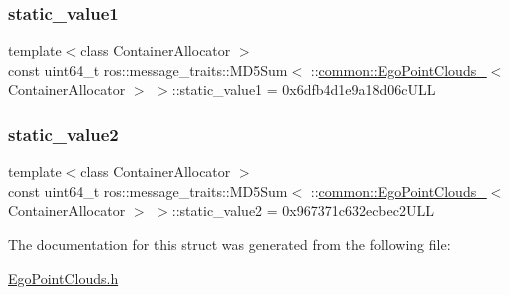 \subsubsection{\texorpdfstring{static\+\_\+value1}{static\_value1}}
{\footnotesize\ttfamily template$<$class Container\+Allocator $>$ \\
const uint64\+\_\+t ros\+::message\+\_\+traits\+::\+M\+D5\+Sum$<$ \+::\hyperlink{structcommon_1_1EgoPointClouds__}{common\+::\+Ego\+Point\+Clouds\+\_\+}$<$ Container\+Allocator $>$ $>$\+::static\+\_\+value1 = 0x6dfb4d1e9a18d06c\+U\+LL\hspace{0.3cm}{\ttfamily [static]}}

\mbox{\label{structros_1_1message__traits_1_1MD5Sum_3_01_1_1common_1_1EgoPointClouds___3_01ContainerAllocator_01_4_01_4_a9f0daec33ee8f913f2eec92f30b86b16}} 
\subsubsection{\texorpdfstring{static\+\_\+value2}{static\_value2}}
{\footnotesize\ttfamily template$<$class Container\+Allocator $>$ \\
const uint64\+\_\+t ros\+::message\+\_\+traits\+::\+M\+D5\+Sum$<$ \+::\hyperlink{structcommon_1_1EgoPointClouds__}{common\+::\+Ego\+Point\+Clouds\+\_\+}$<$ Container\+Allocator $>$ $>$\+::static\+\_\+value2 = 0x967371c632ecbec2\+U\+LL\hspace{0.3cm}{\ttfamily [static]}}



The documentation for this struct was generated from the following file\+:\begin{DoxyCompactItemize}
\item 
\hyperlink{EgoPointClouds_8h}{Ego\+Point\+Clouds.\+h}\end{DoxyCompactItemize}
